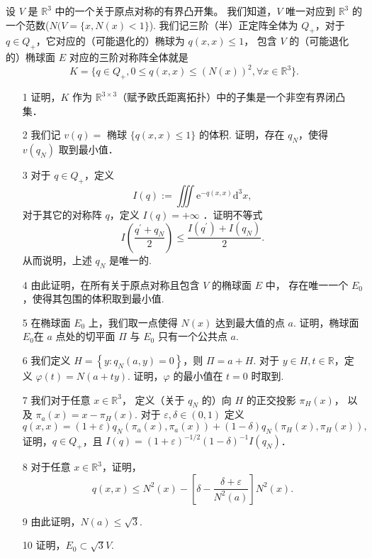 \qquad 设 $V$ 是 $\mathbb{R}^{3}$ 中的一个关于原点对称的有界凸开集。
我们知道，$V$ 唯一对应到 $\mathbb{R}^{3}$ 的一个范数($N(V=\{x, N(x)<1\}$). 
我们记三阶（半）正定阵全体为 $Q_{+}$，对于 $q \in Q_{+}$，它对应的（可能退化的）椭球为 $q(x, x) \leqslant 1$，
包含 $V$ 的（可能退化的）椭球面 $E$ 对应的三阶对称阵全体就是
$$K=\{q \in Q_{+}, 0 \leqslant q(x, x) \leqslant(N(x))^{2}, 
\forall x \in \mathbb{R}^{3}\}.$$
\begin{itemize}
\item[1]证明，$K$ 作为 $\mathbb{R}^{3 \times 3}$（赋予欧氏距离拓扑）中的子集是一个非空有界闭凸集．
\item[2]我们记 $v(q)=$ 椭球 $\{q(x, x) \leqslant 1\}$ 的体积. 
证明，存在 $q_{N}$，使得 $v(q_{N})$ 取到最小值．
\item[3]对于 $q \in Q_{+}$，定义
$$I(q):=\iiint \mathrm{e}^{-q(x, x)} \mathrm{d}^{3} x,$$
对于其它的对称阵 $q$，定义 $I(q)=+\infty$ ．证明不等式
$$I\left(\frac{q^{\prime}+q_{N}}{2}\right) 
\leqslant \frac{I(q^{\prime})+I(q_{N})}{2}.$$
从而说明，上述 $q_{N}$ 是唯一的.
\item[4]由此证明，在所有关于原点对称且包含 $V$ 的椭球面 $E$ 中，
存在唯一一个 $E_{0}$，使得其包围的体积取到最小值.
\item[5]在椭球面 $E_{0}$ 上，我们取一点使得 $N(x)$ 达到最大值的点 $a$. 
证明，椭球面 $E_{0}$在 $a$ 点处的切平面 $\Pi$ 与 $E_{0}$ 只有一个公共点 $a$.
\item[6]我们定义 $H=\left\{y: q_{N}(a, y)=0\right\}$，则 $\Pi=a+H$. 
对于 $y \in H, t \in \mathbb{R}$，定义 $\varphi(t)=N(a+t y)$. 
证明，$\varphi$ 的最小值在 $t=0$ 时取到.
\item[7]我们对于任意 $x \in \mathbb{R}^{3}$，
定义（关于 $q_{N}$ 的）向 $H$ 的正交投影 $\pi_{H}(x)$，
以及 $\pi_{a}(x)=x-\pi_{H}(x)$. 对于 $\varepsilon, \delta \in(0,1)$ 定义
$$q(x, x)=(1+\varepsilon) q_{N}(\pi_{a}(x), \pi_{a}(x))
+(1-\delta) q_{N}(\pi_{H}(x), \pi_{H}(x)),$$
证明，$q \in Q_{+}$，且 $I(q)=(1+\varepsilon)^{-1 / 2}(1-\delta)^{-1} I(q_{N})$．
\item[8]对于任意 $x \in \mathbb{R}^{3}$，证明，
$$q(x, x) \leqslant N^{2}(x)-\left[\delta-\frac{\delta+\varepsilon}{N^{2}(a)}\right] N^{2}(x).$$
\item[9]由此证明，$N(a) \leqslant \sqrt{3}$.
\item[10]证明，$E_{0} \subset \sqrt{3} V$.
\end{itemize}


